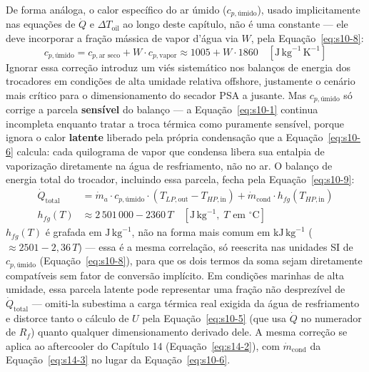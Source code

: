 \documentclass[12pt,a4paper]{article}
\numberwithin{equation}{section}
\numberwithin{table}{section}
\numberwithin{figure}{section}
\begin{document}
{	De forma análoga, o calor específico do ar úmido ($c_{p,\text{úmido}}$), usado implicitamente nas equações de $\dot{Q}$ e $\Delta T_{\text{oil}}$ ao longo deste capítulo, não é uma constante — ele deve incorporar a fração mássica de vapor d'água via $W$, pela Equação~\eqref{eq:s10-8}:
	\begin{equation}\label{eq:s10-8}
 c_{p,\text{úmido}} = c_{p,\text{ar seco}} + W \cdot c_{p,\text{vapor}} \approx 1005 + W \cdot 1860 \quad [\text{J}\,\text{kg}^{-1}\,\text{K}^{-1}] 
\end{equation}
	Ignorar essa correção introduz um viés sistemático nos balanços de energia dos trocadores em condições de alta umidade relativa offshore, justamente o cenário mais crítico para o dimensionamento do secador PSA a jusante. Mas $c_{p,\text{úmido}}$ só corrige a parcela \textbf{sensível} do balanço — a Equação~\eqref{eq:s10-1} continua incompleta enquanto tratar a troca térmica como puramente sensível, porque ignora o calor \textbf{latente} liberado pela própria condensação que a Equação~\eqref{eq:s10-6} calcula: cada quilograma de vapor que condensa libera sua entalpia de vaporização diretamente na água de resfriamento, não no ar. O balanço de energia total do trocador, incluindo essa parcela, fecha pela Equação~\eqref{eq:s10-9}:
	\begin{equation}\label{eq:s10-9}
	\begin{aligned}
		\dot{Q}_{\text{total}} &= \dot{m}_a \cdot c_{p,\text{úmido}} \cdot (T_{LP,\text{out}} - T_{HP,\text{in}}) + \dot{m}_{\text{cond}} \cdot h_{fg}(T_{HP,\text{in}}) \\[4pt]
		h_{fg}(T) &\approx 2\,501\,000 - 2360 \, T \quad [\text{J}\,\text{kg}^{-1}, \; T \text{ em } ^{\circ}\text{C}]
	\end{aligned}
\end{equation}
	$h_{fg}(T)$ é grafada em $\text{J}\,\text{kg}^{-1}$, não na forma mais comum em $\text{kJ}\,\text{kg}^{-1}$ ($\approx 2501 - 2{,}36\,T$) — essa é a mesma correlação, só reescrita nas unidades SI de $c_{p,\text{úmido}}$ (Equação~\eqref{eq:s10-8}), para que os dois termos da soma sejam diretamente compatíveis sem fator de conversão implícito. Em condições marinhas de alta umidade, essa parcela latente pode representar uma fração não desprezível de $\dot{Q}_{\text{total}}$ — omiti-la subestima a carga térmica real exigida da água de resfriamento e distorce tanto o cálculo de $U$ pela Equação~\eqref{eq:s10-5} (que usa $\dot{Q}$ no numerador de $R_f$) quanto qualquer dimensionamento derivado dele. A mesma correção se aplica ao aftercooler do Capítulo 14 (Equação~\eqref{eq:s14-2}), com $\dot{m}_{\text{cond}}$ da Equação~\eqref{eq:s14-3} no lugar da Equação~\eqref{eq:s10-6}.

}
\end{document}
